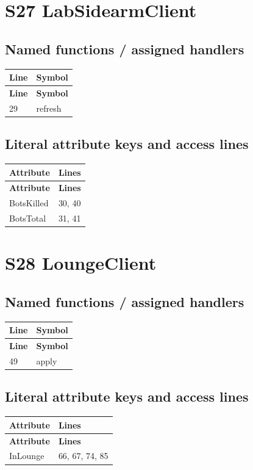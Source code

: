 \section{S27 LabSidearmClient}
\subsection{Named functions /\allowbreak{} assigned handlers}
\begin{longtable}{p{}p{}}
\toprule
\textbf{Line} & \textbf{Symbol} \\ \midrule
\endfirsthead
\textbf{Line} & \textbf{Symbol} \\ \midrule
\endhead
29 & refresh \\
\bottomrule
\end{longtable}
\subsection{Literal attribute keys and access lines}
\begin{longtable}{p{}p{}}
\toprule
\textbf{Attribute} & \textbf{Lines} \\ \midrule
\endfirsthead
\textbf{Attribute} & \textbf{Lines} \\ \midrule
\endhead
BotsKilled & 30, 40 \\
BotsTotal & 31, 41 \\
\bottomrule
\end{longtable}
\section{S28 LoungeClient}
\subsection{Named functions /\allowbreak{} assigned handlers}
\begin{longtable}{p{}p{}}
\toprule
\textbf{Line} & \textbf{Symbol} \\ \midrule
\endfirsthead
\textbf{Line} & \textbf{Symbol} \\ \midrule
\endhead
49 & apply \\
\bottomrule
\end{longtable}
\subsection{Literal attribute keys and access lines}
\begin{longtable}{p{}p{}}
\toprule
\textbf{Attribute} & \textbf{Lines} \\ \midrule
\endfirsthead
\textbf{Attribute} & \textbf{Lines} \\ \midrule
\endhead
InLounge & 66, 67, 74, 85 \\
\bottomrule
\end{longtable}
